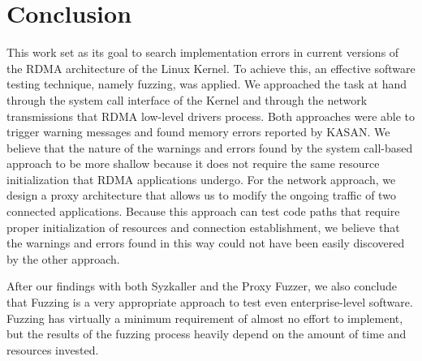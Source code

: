 \section{Conclusion}

This work set as its goal to search implementation errors in current versions of the RDMA architecture of the Linux Kernel.
To achieve this, an effective software testing technique, namely fuzzing, was applied.
We approached the task at hand through the system call interface of the Kernel and through the network transmissions that RDMA low-level
drivers process. Both approaches were able to trigger warning messages and found memory errors reported by KASAN.\@
We believe that the nature
of the warnings and errors found by the system call-based approach to be more shallow because it does not require the same resource initialization that RDMA applications undergo.  For the network approach,
we design a proxy architecture that allows us to modify the ongoing traffic of two connected applications. Because this approach can test code paths that require proper initialization of resources and connection
establishment, we believe that the warnings and errors found in this way
could not have been easily discovered by the other approach.

After our findings with both Syzkaller and the Proxy Fuzzer, we also conclude that Fuzzing is a
very appropriate approach to test even enterprise-level software. Fuzzing has virtually a minimum requirement
of almost no effort to implement, but the results of the fuzzing process heavily depend on the
amount of time and resources invested.
